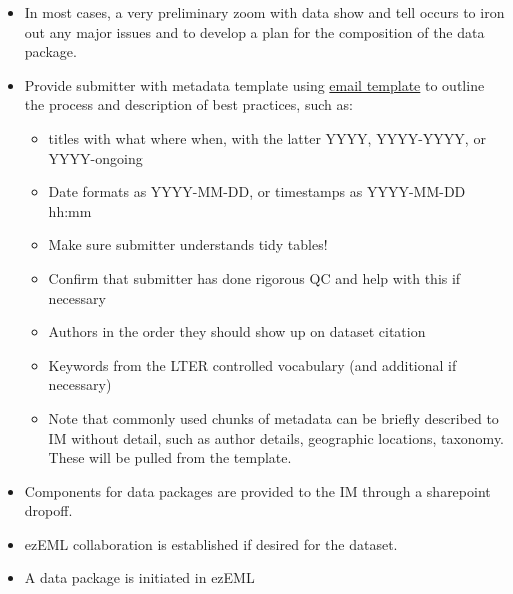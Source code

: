 \documentclass[
  letterpaper,
  DIV=11,
  numbers=noendperiod]{scrreprt}
\providecommand{\tightlist}{%
  \setlength{\itemsep}{0pt}\setlength{\parskip}{0pt}}\usepackage{longtable,booktabs,array}
\begin{document}
\begin{itemize}
\tightlist
\item
  In most cases, a very preliminary zoom with data show and tell occurs
  to iron out any major issues and to develop a plan for the composition
  of the data package.
\item
  Provide submitter with metadata template using \href{DBD}{email
  template} to outline the process and description of best practices,
  such as:

  \begin{itemize}
  \tightlist
  \item
    titles with what where when, with the latter YYYY, YYYY-YYYY, or
    YYYY-ongoing
  \item
    Date formats as YYYY-MM-DD, or timestamps as YYYY-MM-DD hh:mm
  \item
    Make sure submitter understands tidy tables!
  \item
    Confirm that submitter has done rigorous QC and help with this if
    necessary
  \item
    Authors in the order they should show up on dataset citation
  \item
    Keywords from the LTER controlled vocabulary (and additional if
    necessary)
  \item
    Note that commonly used chunks of metadata can be briefly described
    to IM without detail, such as author details, geographic locations,
    taxonomy. These will be pulled from the template.
  \end{itemize}
\item
  Components for data packages are provided to the IM through a
  sharepoint dropoff.
\item
  ezEML collaboration is established if desired for the dataset.
\item
  A data package is initiated in ezEML


\end{itemize}
\end{document}

